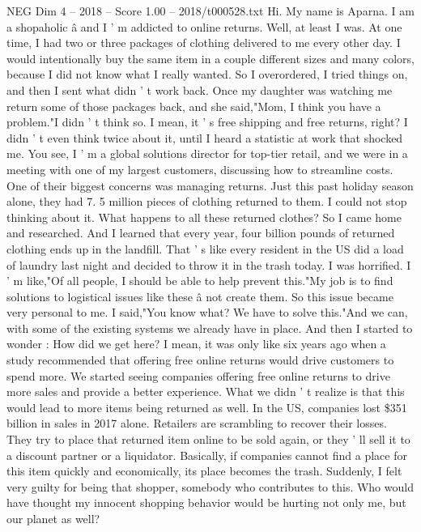 \begin{textsample}{NEG Dim 4 – 2018 – Score 1.00 – 2018/t000528.txt}  \label{ex:f4_neg_020}
Hi.
My name is Aparna.
I am a shopaholic â and I ' m addicted to online returns.
Well, at least I was.
At one time, I had two or three packages of clothing delivered to me every other day.
I would intentionally buy the same item in a couple different sizes and many colors, because I did not know what I really wanted.
So I overordered, I tried things on, and then I sent what didn ' t work back.
Once my daughter was watching me return some of those packages back, and she said,"Mom, I think you have a problem."I didn ' t think so.
I mean, it ' s free shipping and free returns, right?
I didn ' t even think twice about it, until I heard a statistic at work that shocked me.
You see, I ' m a global solutions director for top-tier retail, and we were in a meeting with one of my largest customers, discussing how to streamline costs.
One of their biggest concerns was managing returns.
Just this past holiday season alone, they had 7. 5 million pieces of clothing returned to them.
I could not stop thinking about it.
What happens to all these returned clothes?
So I came home and researched.
And I learned that every year, four billion pounds of returned clothing ends up in the landfill.
That ' s like every resident in the US did a load of laundry last night and decided to throw it in the trash today.
I was horrified.
I ' m like,"Of all people, I should be able to help prevent this."My job is to find solutions to logistical issues like these â not create them.
So this issue became very personal to me.
I said,"You know what?
We have to solve this."And we can, with some of the existing systems we already have in place.
And then I started to wonder : How did we get here?
I mean, it was only like six years ago when a study recommended that offering free online returns would drive customers to spend more.
We started seeing companies offering free online returns to drive more sales and provide a better experience.
What we didn ' t realize is that this would lead to more items being returned as well.
In the US, companies lost \$351 billion in sales in 2017 alone.
Retailers are scrambling to recover their losses.
They try to place that returned item online to be sold again, or they ' ll sell it to a discount partner or a liquidator.
Basically, if companies cannot find a place for this item quickly and economically, its place becomes the trash.
Suddenly, I felt very guilty for being that shopper, somebody who contributes to this.
Who would have thought my innocent shopping behavior would be hurting not only me, but our planet as well?

\end{textsample}
